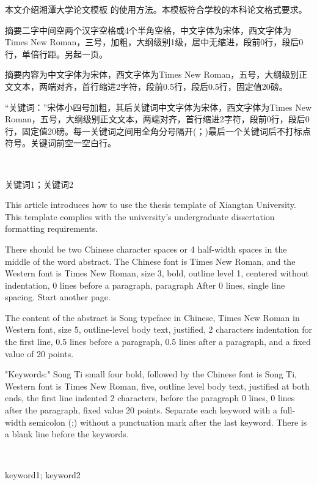 ﻿%
\begin{cnabstract}
本文介绍湘潭大学论文模板 的使用方法。本模板符合学校的本科论文格式要求。

摘要二字中间空两个汉字空格或4个半角空格，中文字体为宋体，西文字体为Times New Roman，三号，加粗，大纲级别1级，居中无缩进，段前0行，段后0行，单倍行距。另起一页。

摘要内容为中文字体为宋体，西文字体为Times New Roman，五号，大纲级别正文文本，两端对齐，首行缩进2字符，段前0.5行，段后0.5行，固定值20磅。

“关键词：”宋体小四号加粗，其后关键词中文字体为宋体，西文字体为Times New Roman，五号，大纲级别正文文本，两端对齐，首行缩进2字符，段前0行，段后0行，固定值20磅。每一关键词之间用全角分号隔开(；)最后一个关键词后不打标点符号。关键词前空一空白行。
\end{cnabstract}
~\par
\begin{cnkeywords}
关键词1；关键词2
\end{cnkeywords}
\newpage
{} %
\begin{enabstract}
This article introduces how to use the thesis template of Xiangtan University. This template complies with the university's undergraduate dissertation formatting requirements.

There should be two Chinese character spaces or 4 half-width spaces in the middle of the word abstract. The Chinese font is Times New Roman, and the Western font is Times New Roman, size 3, bold, outline level 1, centered without indentation, 0 lines before a paragraph, paragraph After 0 lines, single line spacing. Start another page.

The content of the abstract is Song typeface in Chinese, Times New Roman in Western font, size 5, outline-level body text, justified, 2 characters indentation for the first line, 0.5 lines before a paragraph, 0.5 lines after a paragraph, and a fixed value of 20 points.

"Keywords:" Song Ti small four bold, followed by the Chinese font is Song Ti, Western font is Times New Roman, five, outline level body text, justified at both ends, the first line indented 2 characters, before the paragraph 0 lines, 0 lines after the paragraph, fixed value 20 points. Separate each keyword with a full-width semicolon (;) without a punctuation mark after the last keyword. There is a blank line before the keywords.
\end{enabstract}
~\par
\begin{enkeywords}
keyword1; keyword2
\end{enkeywords} 